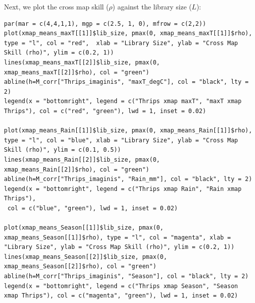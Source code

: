 Next, we plot the cross map skill ($\rho$) against the library size ($L$):

\begin{lstlisting}
par(mar = c(4,4,1,1), mgp = c(2.5, 1, 0), mfrow = c(2,2))
plot(xmap_means_maxT[[1]]$lib_size, pmax(0, xmap_means_maxT[[1]]$rho), type = "l", col = "red",  xlab = "Library Size", ylab = "Cross Map Skill (rho)", ylim = c(0.2, 1))
lines(xmap_means_maxT[[2]]$lib_size, pmax(0, xmap_means_maxT[[2]]$rho), col = "green")
abline(h=M_corr["Thrips_imaginis", "maxT_degC"], col = "black", lty = 2)
legend(x = "bottomright", legend = c("Thrips xmap maxT", "maxT xmap Thrips"), col = c("red", "green"), lwd = 1, inset = 0.02)

plot(xmap_means_Rain[[1]]$lib_size, pmax(0, xmap_means_Rain[[1]]$rho), type = "l", col = "blue", xlab = "Library Size", ylab = "Cross Map Skill (rho)", ylim = c(0.1, 0.5))
lines(xmap_means_Rain[[2]]$lib_size, pmax(0, xmap_means_Rain[[2]]$rho), col = "green")
abline(h=M_corr["Thrips_imaginis", "Rain_mm"], col = "black", lty = 2)
legend(x = "bottomright", legend = c("Thrips xmap Rain", "Rain xmap Thrips"), 
 col = c("blue", "green"), lwd = 1, inset = 0.02)

plot(xmap_means_Season[[1]]$lib_size, pmax(0, xmap_means_Season[[1]]$rho), type = "l", col = "magenta", xlab = "Library Size", ylab = "Cross Map Skill (rho)", ylim = c(0.2, 1))
lines(xmap_means_Season[[2]]$lib_size, pmax(0, xmap_means_Season[[2]]$rho), col = "green")
abline(h=M_corr["Thrips_imaginis", "Season"], col = "black", lty = 2)
legend(x = "bottomright", legend = c("Thrips xmap Season", "Season xmap Thrips"), col = c("magenta", "green"), lwd = 1, inset = 0.02)
\end{lstlisting}

